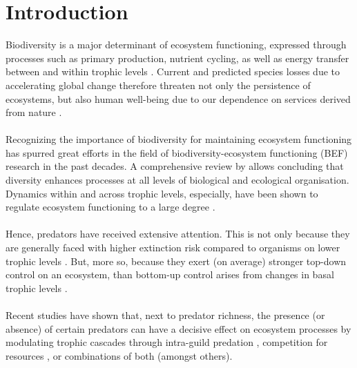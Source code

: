 \chapter{Introduction}
\label{chap:intro}
Biodiversity is a major determinant of ecosystem functioning, expressed through processes such as primary production, nutrient cycling, as well as energy transfer between and within trophic levels \citep[cf.][for review]{Tilman2014}. 
Current and predicted species losses due to accelerating global change \citep[e.g.][]{Ceballos2015, Urban2015} therefore threaten not only the persistence of ecosystems, but also human well-being due to our dependence on services derived from nature \citep{MEA2005,Cardinale2012}.
\\\\
Recognizing the importance of biodiversity for maintaining ecosystem functioning has spurred great efforts in the field of biodiversity-ecosystem functioning (BEF) research in the past decades.  A comprehensive review by \cite{Cardinale2012} allows concluding that diversity enhances processes at all levels of biological and ecological organisation.  Dynamics within and across trophic levels, especially, have been shown to regulate ecosystem functioning to a large degree \citep{Duffy2007, Estes2011}.  \\\\
Hence, predators have received extensive attention. This is not only because they are generally faced with higher extinction risk compared to organisms on lower trophic levels  \citep{Dobson2006,Ripple2014}. But, more so, because they exert (on average) stronger top-down control on an ecosystem, than bottom-up control arises from changes in basal trophic levels \citep{Borer2006}.  \\\\
Recent studies have shown that, next to predator richness, the presence (or absence) of certain predators can have a decisive effect on ecosystem processes by modulating trophic cascades through intra-guild predation \citep{Finke2005,Wallach2015}, competition for resources  \citep{OConnor2008,Rodriguez-Lozano2015}, or combinations of both (amongst others). %
